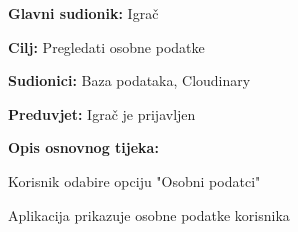 					
					\noindent {}
					\begin{packed_item}
					
					\item \textbf{Glavni sudionik: }Igrač
					\item  \textbf{Cilj:} Pregledati osobne podatke
					\item  \textbf{Sudionici:} Baza podataka, Cloudinary
					\item  \textbf{Preduvjet:} Igrač je prijavljen
					\item  \textbf{Opis osnovnog tijeka:}
					
					\item[] \begin{packed_enum}
						
						\item Korisnik odabire opciju "Osobni podatci"
						\item Aplikacija prikazuje osobne podatke korisnika
					\end{packed_enum}
					\end{packed_item}
			
